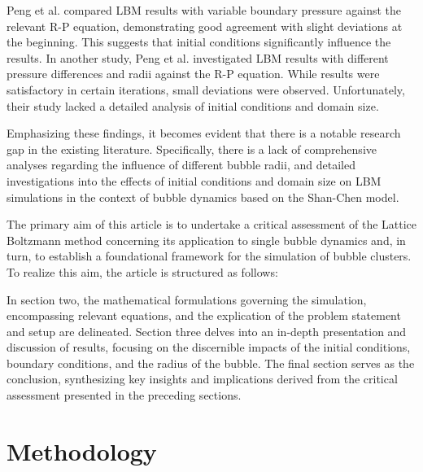 \documentclass[review]{elsarticle}
\begin{document}
Peng et al. \cite{peng2019simulation} compared LBM results with variable boundary pressure against the relevant R-P equation, demonstrating good agreement with slight deviations at the beginning. This suggests that initial conditions significantly influence the results. In another study, Peng et al. \cite{peng2018single} investigated LBM results with different pressure differences and radii against the R-P equation. While results were satisfactory in certain iterations, small deviations were observed. Unfortunately, their study lacked a detailed analysis of initial conditions and domain size.

Emphasizing these findings, it becomes evident that there is a notable research gap in the existing literature. Specifically, there is a lack of comprehensive analyses regarding the influence of different bubble radii, and detailed investigations into the effects of initial conditions and domain size on LBM simulations in the context of bubble dynamics based on the Shan-Chen model.

The primary aim of this article is to undertake a critical assessment of the Lattice Boltzmann method concerning its application to single bubble dynamics and, in turn, to establish a foundational framework for the simulation of bubble clusters. To realize this aim, the article is structured as follows:

In section two, the mathematical formulations governing the simulation, encompassing relevant equations, and the explication of the problem statement and setup are delineated. Section three delves into an in-depth presentation and discussion of results, focusing on the discernible impacts of the initial conditions, boundary conditions, and the radius of the bubble. The final section serves as the conclusion, synthesizing key insights and implications derived from the critical assessment presented in the preceding sections. 

\section{Methodology}
\end{document}
